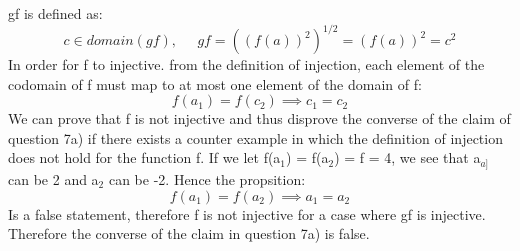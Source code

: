 \documentclass[11pt]{article}
\begin{document}
\begin{enumerate}
gf is defined as: 
\begin{equation}
   c \in domain(gf), \;\;\;\;\;   gf = ((f(a))^{2})^{1/2} = (f(a))^{2} = c^{2}
\end{equation}
In order for f to injective. from the definition of injection, each element of the codomain of f must map to at most one element of the domain of f: 
\begin{equation}
    f(a_{1}) = f(c_{2}) \implies c_{1} = c_{2} 
\end{equation}
We can prove that f is not injective and thus disprove the converse of the claim of question 7a) if there exists a counter example in which the definition of injection does not hold for the function f. 
\newline 
If we let f(a$_{1}$) = f(a$_{2}$) = f = 4, we see that a$_{a]}$ can be 2 and a$_{2}$ can be -2. Hence the propsition: 
\begin{equation}
    f(a_{1}) = f(a_{2}) \implies a_{1} = a_{2}
\end{equation}
Is a false statement, therefore f is not injective for a case where gf is injective. Therefore the converse of the claim in question 7a) is false. 

\end{enumerate}
\end{document}
